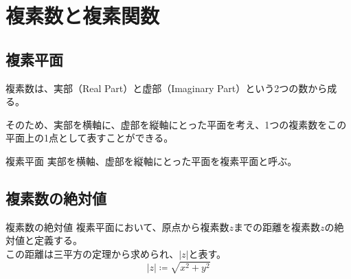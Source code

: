 \documentclass[../math-imaging]{subfiles}
\begin{document}
\chapter{複素数と複素関数}

\section{複素平面}

複素数は、実部（Real Part）と虚部（Imaginary Part）という2つの数から成る。

そのため、実部を横軸に、虚部を縦軸にとった平面を考え、1つの複素数をこの平面上の1点として表すことができる。

\begin{definition}{複素平面}
  実部を横軸、虚部を縦軸にとった平面を複素平面と呼ぶ。
\end{definition}

\begin{center}
\end{center}

\section{複素数の絶対値}

\begin{definition}{複素数の絶対値}
  \newline
  複素平面において、原点から複素数$z$までの距離を複素数$z$の絶対値と定義する。\\
  この距離は三平方の定理から求められ、$|z|$と表す。
  \LARGE
  \begin{equation}
    |z| \coloneqq \sqrt{x^2 + y^2}
  \end{equation}
\end{definition}
\end{document}

